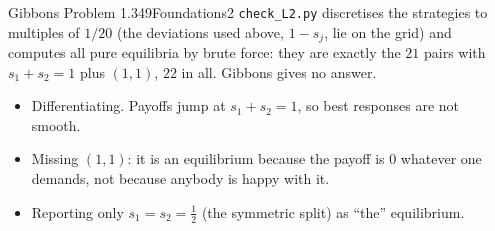 \begin{exsol}{Gibbons Problem 1.3}{49}{Foundations}{2}
\verify \texttt{check\_L2.py} discretises the strategies to multiples of $1/20$ (the deviations used
above, $1 - s_j$, lie on the grid) and computes all pure equilibria by brute force: they are exactly
the $21$ pairs with $s_1 + s_2 = 1$ plus $(1,1)$, $22$ in all. Gibbons gives no answer.

\mistakes
\begin{itemize}
  \item Differentiating. Payoffs jump at $s_1 + s_2 = 1$, so best responses are not smooth.
  \item Missing $(1,1)$: it is an equilibrium because the payoff is $0$ whatever one demands,
  not because anybody is happy with it.
  \item Reporting only $s_1 = s_2 = \tfrac12$ (the symmetric split) as ``the'' equilibrium.
\end{itemize}
\end{exsol}
